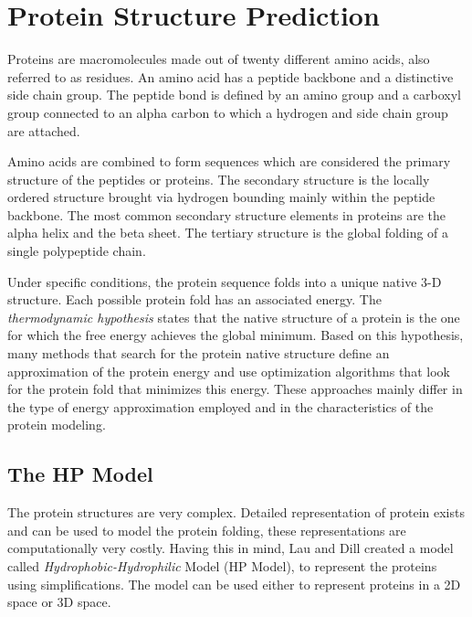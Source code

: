 \section{Protein Structure Prediction} \label{sec:proteinfolding}


Proteins are macromolecules made out of  twenty different amino acids, also referred to as residues. An amino acid has a peptide backbone and a distinctive side chain group. The peptide bond is defined by an amino group and a carboxyl group connected to an alpha carbon to which  a hydrogen and side chain group are attached.


Amino acids are combined to form sequences which are considered the primary structure of the peptides or proteins. The secondary structure is the locally ordered structure brought via hydrogen bounding mainly within the peptide backbone. The most common secondary structure elements in proteins are the alpha helix and the beta sheet. The tertiary structure is the global folding of a single polypeptide chain.


Under specific conditions, the protein sequence folds into a unique native 3-D structure. Each possible protein fold has an associated energy. The \emph{thermodynamic hypothesis} states that the native structure of a protein is the one for which the free energy achieves the global minimum. Based on this hypothesis, many methods \cite{custodio2004investigation, hsu2003growth, krasnogor2002multimeme, lin2011protein, unger1993genetic} that search for the protein native structure define an approximation of the protein energy and use optimization algorithms that look for the protein fold that minimizes this energy. These approaches mainly differ in the type of energy approximation employed and in the characteristics of the protein modeling.


\subsection{The HP Model} \label{sec:hpModel}


The protein structures are very complex. Detailed representation of protein exists and can be used to model the protein folding, these representations are computationally very costly. Having this in mind, Lau and Dill \cite{lau1989lattice} created a model called \textit{Hydrophobic-Hydrophilic} Model (HP Model), to represent the proteins using simplifications. The model can be used either to represent proteins in a 2D space or 3D space.


